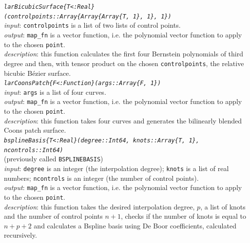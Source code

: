 \documentclass[a4paper,11pt]{article}
\begin{document}
\emph{\texttt{larBicubicSurface\{T<:Real\} \\ (controlpoints::Array\{Array\{Array\{T, 1\}, 1\}, 1\})}} \\
\emph{input}: \texttt{controlpoints} is a list of two lists of control points. \\
\emph{output}: \texttt{map\_fn} is a vector function, i.e. the polynomial vector function to apply to the chosen \texttt{point}. \\
\emph{description}: this function calculates the first four Bernstein polynomials of third degree and then, with tensor product on the chosen \texttt{controlpoints}, the relative bicubic B\'ezier surface.  \\

\emph{\texttt{larCoonsPatch\{F<:Function\}(args::Array\{F, 1\})}} \\
\emph{input}: \texttt{args} is a list of four curves. \\
\emph{output}: \texttt{map\_fn} is a vector function, i.e. the polynomial vector function to apply to the chosen \texttt{point}. \\
\emph{description}: this function takes four curves and generates the bilinearly blended Coons patch surface.  \\

\emph{\texttt{bsplineBasis\{T<:Real\}(degree::Int64, knots::Array\{T, 1\},  \\ ncontrols::Int64)}} \\
(previously called \texttt{BSPLINEBASIS}) \\
\emph{input}: \texttt{degree} is an integer (the interpolation degree); \texttt{knots} is a list of real numbers; \texttt{ncontrols} is an integer (the number of control points).\\
\emph{output}: \texttt{map\_fn} is a vector function, i.e. the polynomial vector function to apply to the chosen \texttt{point}. \\
\emph{description}: this function takes the desired interpolation degree, $p$, a list of knots and the number of control points $n+1$, checks if the number of knots is equal to $n+p+2$ and calculates a Bspline basis using De Boor coefficients, calculated recursively.  \\
\end{document}
